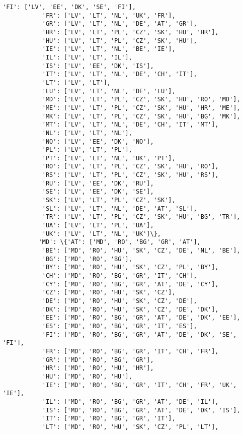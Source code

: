 \documentclass[11pt]{article}
\begin{document}
\begin{Verbatim}[commandchars=\\\{\}]
           'FI': ['LV', 'EE', 'DK', 'SE', 'FI'],
           'FR': ['LV', 'LT', 'NL', 'UK', 'FR'],
           'GR': ['LV', 'LT', 'NL', 'DE', 'AT', 'GR'],
           'HR': ['LV', 'LT', 'PL', 'CZ', 'SK', 'HU', 'HR'],
           'HU': ['LV', 'LT', 'PL', 'CZ', 'SK', 'HU'],
           'IE': ['LV', 'LT', 'NL', 'BE', 'IE'],
           'IL': ['LV', 'LT', 'IL'],
           'IS': ['LV', 'EE', 'DK', 'IS'],
           'IT': ['LV', 'LT', 'NL', 'DE', 'CH', 'IT'],
           'LT': ['LV', 'LT'],
           'LU': ['LV', 'LT', 'NL', 'DE', 'LU'],
           'MD': ['LV', 'LT', 'PL', 'CZ', 'SK', 'HU', 'RO', 'MD'],
           'ME': ['LV', 'LT', 'PL', 'CZ', 'SK', 'HU', 'HR', 'ME'],
           'MK': ['LV', 'LT', 'PL', 'CZ', 'SK', 'HU', 'BG', 'MK'],
           'MT': ['LV', 'LT', 'NL', 'DE', 'CH', 'IT', 'MT'],
           'NL': ['LV', 'LT', 'NL'],
           'NO': ['LV', 'EE', 'DK', 'NO'],
           'PL': ['LV', 'LT', 'PL'],
           'PT': ['LV', 'LT', 'NL', 'UK', 'PT'],
           'RO': ['LV', 'LT', 'PL', 'CZ', 'SK', 'HU', 'RO'],
           'RS': ['LV', 'LT', 'PL', 'CZ', 'SK', 'HU', 'RS'],
           'RU': ['LV', 'EE', 'DK', 'RU'],
           'SE': ['LV', 'EE', 'DK', 'SE'],
           'SK': ['LV', 'LT', 'PL', 'CZ', 'SK'],
           'SL': ['LV', 'LT', 'NL', 'DE', 'AT', 'SL'],
           'TR': ['LV', 'LT', 'PL', 'CZ', 'SK', 'HU', 'BG', 'TR'],
           'UA': ['LV', 'LT', 'PL', 'UA'],
           'UK': ['LV', 'LT', 'NL', 'UK']\},
          'MD': \{'AT': ['MD', 'RO', 'BG', 'GR', 'AT'],
           'BE': ['MD', 'RO', 'HU', 'SK', 'CZ', 'DE', 'NL', 'BE'],
           'BG': ['MD', 'RO', 'BG'],
           'BY': ['MD', 'RO', 'HU', 'SK', 'CZ', 'PL', 'BY'],
           'CH': ['MD', 'RO', 'BG', 'GR', 'IT', 'CH'],
           'CY': ['MD', 'RO', 'BG', 'GR', 'AT', 'DE', 'CY'],
           'CZ': ['MD', 'RO', 'HU', 'SK', 'CZ'],
           'DE': ['MD', 'RO', 'HU', 'SK', 'CZ', 'DE'],
           'DK': ['MD', 'RO', 'HU', 'SK', 'CZ', 'DE', 'DK'],
           'EE': ['MD', 'RO', 'BG', 'GR', 'AT', 'DE', 'DK', 'EE'],
           'ES': ['MD', 'RO', 'BG', 'GR', 'IT', 'ES'],
           'FI': ['MD', 'RO', 'BG', 'GR', 'AT', 'DE', 'DK', 'SE', 'FI'],
           'FR': ['MD', 'RO', 'BG', 'GR', 'IT', 'CH', 'FR'],
           'GR': ['MD', 'RO', 'BG', 'GR'],
           'HR': ['MD', 'RO', 'HU', 'HR'],
           'HU': ['MD', 'RO', 'HU'],
           'IE': ['MD', 'RO', 'BG', 'GR', 'IT', 'CH', 'FR', 'UK', 'IE'],
           'IL': ['MD', 'RO', 'BG', 'GR', 'AT', 'DE', 'IL'],
           'IS': ['MD', 'RO', 'BG', 'GR', 'AT', 'DE', 'DK', 'IS'],
           'IT': ['MD', 'RO', 'BG', 'GR', 'IT'],
           'LT': ['MD', 'RO', 'HU', 'SK', 'CZ', 'PL', 'LT'],

\end{Verbatim}
\end{document}
